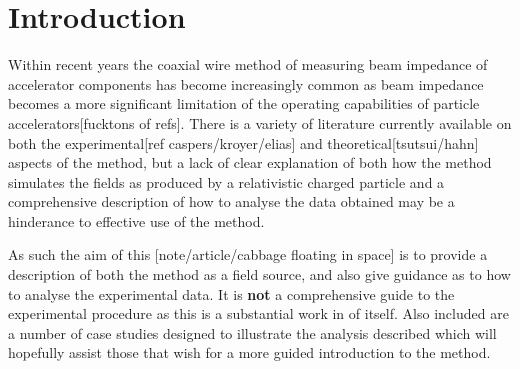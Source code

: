 \section{Introduction}

Within recent years the coaxial wire method of measuring beam impedance of accelerator components has become increasingly common as beam impedance becomes a more significant limitation of the operating capabilities of particle accelerators[fucktons of refs]. There is a variety of literature currently available on both the experimental[ref caspers/kroyer/elias] and theoretical[tsutsui/hahn] aspects of the method, but a lack of clear explanation of both how the method simulates the fields as produced by a relativistic charged particle and a comprehensive description of how to analyse the data obtained may be a hinderance to effective use of the method.

As such the aim of this [note/article/cabbage floating in space] is to provide a description of both the method as a field source, and also give guidance as to how to analyse the experimental data. It is \textbf{not} a comprehensive guide to the experimental procedure as this is a substantial work in of itself. Also included are a number of case studies designed to illustrate the analysis described which will hopefully assist those that wish for a more guided introduction to the method.